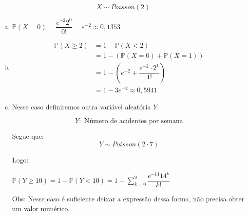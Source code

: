 \documentclass{article}
\begin{document}
$$X \sim Poisson(2)$$
\begin{enumerate}[a)]
    \item  $\mathds{P}(X=0) = \dfrac{e^{-2} 2^0}{0!} = e^{-2} \approx 0,1353 $
    \item \begin{align*}
        \mathds{P}(X \geq 2) &= 1 - \mathds{P}(X < 2)\\
        &=  1- (\mathds{P}(X=0) + \mathds{P}(X=1))\\
        &= 1-\left(e^{-2} + \dfrac{e^{-2} \cdot 2^1}{1!}\right)\\
        &=  1- 3e^{-2} \approx 0,5941
    \end{align*}
    \item Nesse caso definiremos outra variável aleatória $Y$:

    $$Y: \text{ Número de acidentes por semana} $$

    Segue que:
    $$ Y \sim Poisson(2\cdot 7 )$$

    Logo:

    $\mathds{P}(Y \geq 10) = 1 - \mathds{P}(Y < 10) = 1- \sum_{k=0}^{9} \dfrac{e^{-14}14^k}{k!}$

    Obs: Nesse caso é suficiente deixar a expressão dessa forma, não precisa obter um valor numérico. 
\end{enumerate}
\end{document}
